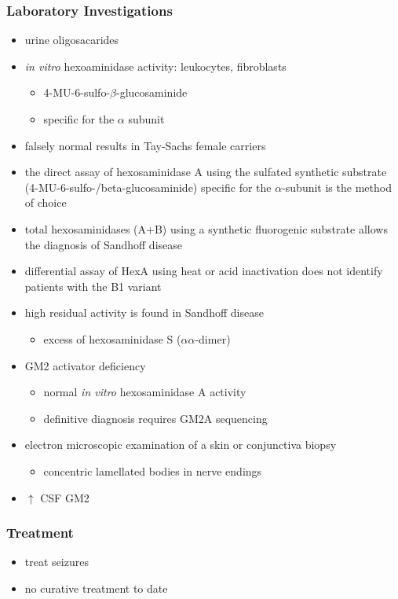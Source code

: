 \documentclass[12pt]{scrartcl}
\begin{document}
\subsubsection{Laboratory Investigations}
\label{sec:org71d1783}
\begin{itemize}
\item urine oligosacarides
\item \emph{in vitro} hexoaminidase activity: leukocytes, fibroblasts
\begin{itemize}
\item 4-MU-6-sulfo-\(\beta\)-glucosaminide
\item specific for the \(\alpha\) subunit
\end{itemize}
\item falsely normal results in Tay-Sachs female carriers
\item the direct assay of hexosaminidase A using the sulfated synthetic
substrate (4-MU-6-sulfo-/beta-glucosaminide) specific for the \(\alpha\)-subunit
is the method of choice
\item total hexosaminidases (A+B) using a synthetic fluorogenic substrate
allows the diagnosis of Sandhoff disease
\item differential assay of HexA using heat or acid
inactivation does not identify patients with the B1 variant

\item high residual activity is found in Sandhoff disease
\begin{itemize}
\item excess of hexosaminidase S (\(\alpha \alpha\)-dimer)
\end{itemize}
\item GM2 activator deficiency
\begin{itemize}
\item normal \emph{in vitro} hexosaminidase A activity
\item definitive diagnosis requires GM2A sequencing
\end{itemize}
\item electron microscopic examination of a skin or conjunctiva biopsy
\begin{itemize}
\item concentric lamellated bodies in nerve endings
\end{itemize}
\item \(\uparrow\) CSF GM2
\end{itemize}

\subsubsection{Treatment}
\label{sec:orgb859400}
\begin{itemize}
\item treat seizures
\item no curative treatment to date
\end{itemize}
\end{document}
